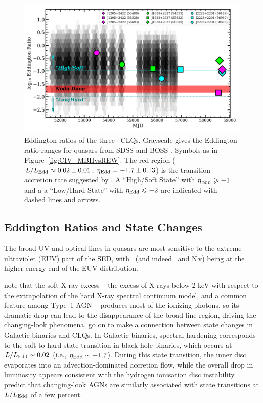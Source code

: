 \documentclass[fleqn,usenatbib]{mnras}
\begin{document}
\begin{figure}
  \centering
  \includegraphics[width=14.5cm, trim=0.2cm 0.2cm 0.0cm 0.2cm, clip]
  {figures/MJD_vs_Eddington_20200710}
  \vspace{-12pt}
  \caption[]{Eddington ratios of the three \civ\ CLQs.  Grayscale gives the
    Eddington ratio ranges for quasars from SDSS \citet[][]{Shen2011} and
    BOSS \citep[][]{Kozlowski2017}.  Symbols as in
    Figure~\ref{fig:CIV_MBHvsREW}.  The red region ($L / L_{\rm Edd}
    \approx 0.02 \pm 0.01$; $\eta_{\rm Edd} = -1.7 \pm 0.13$) is the
    transition accretion rate suggested by \citet{NodaDone2018}.  A
    ``High/Soft State'' with $\eta_{\rm Edd} \geq -1$ and a a ``Low/Hard
    State'' with $\eta_{\rm Edd} \leq -2$ are indicated with dashed lines
    and arrows.}
  \label{fig:Eddington_ratios}
\end{figure}

\subsection{Eddington Ratios and State Changes} 
The broad UV and optical lines in quasars are most sensitive to the
extreme ultraviolet (EUV) part of the SED, with \civ\ (and indeed 
\heii\ and N\,{\sc v}) being at the higher energy end of the EUV
distribution.

\citet{NodaDone2018} note that the soft X-ray excess -- the excess of
X-rays below 2 keV with respect to the extrapolation of the hard X-ray
spectral continuum model, and a common feature among Type~1 AGN --
produces most of the ionizing photons, so its dramatic drop can lead
to the disappearance of the broad-line region, driving the
changing-look phenomena. \citet{NodaDone2018} go on to make a
connection between state changes in Galactic binaries and CLQs.  In
Galactic binaries, spectral hardening corresponds to the soft-to-hard
state transition in black hole binaries, which occurs at $L / L_{\rm
Edd} \sim 0.02$ (i.e., $\eta_{\rm Edd} \sim -1.7$).  During this state
transition, the inner disc evaporates into an advection-dominated
accretion flow, while the overall drop in luminosity appears
consistent with the hydrogen ionisation disc instability.
\citet{NodaDone2018} predict that changing-look AGNs are similarly
associated with state transitions at $L / L_{\rm Edd}$ of a few
percent.
\end{document}
